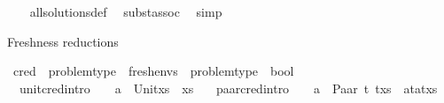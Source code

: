 \begin{isabellebody}
%
\isadelimproof
\ \ %
\endisadelimproof
%
\isatagproof
{}\isamarkupfalse%
\ all{\isacharunderscore}{\kern0pt}solutions{\isacharunderscore}{\kern0pt}def\ \isamarkupfalse%
\ subst{\isacharunderscore}{\kern0pt}assoc\ \isamarkupfalse%
\ simp%
\endisatagproof
{\isafoldproof}%
%
\isadelimproof
%
\endisadelimproof
%
\begin{isamarkuptext}%
Freshness reductions%
\end{isamarkuptext}\isamarkuptrue%
\isamarkupfalse%
\ c{\isacharunderscore}{\kern0pt}red\ {\isacharcolon}{\kern0pt}{\isacharcolon}{\kern0pt}\ {\isachardoublequoteopen}problem{\isacharunderscore}{\kern0pt}type\ {\isasymRightarrow}\ fresh{\isacharunderscore}{\kern0pt}envs\ {\isasymRightarrow}\ problem{\isacharunderscore}{\kern0pt}type\ {\isasymRightarrow}\ bool{\isachardoublequoteclose}\ {\isacharparenleft}{\kern0pt}{\isachardoublequoteopen}{\isacharunderscore}{\kern0pt}\ {\isasymturnstile}\ {\isacharunderscore}{\kern0pt}\ {\isasymrightarrow}\ {\isacharunderscore}{\kern0pt}\ {\isachardoublequoteclose}\ {\isacharbrackleft}{\kern0pt}{}{}{\isacharcomma}{\kern0pt}{}{}{\isacharcomma}{\kern0pt}{}{}{\isacharbrackright}{\kern0pt}\ {}{}{\isacharparenright}{\kern0pt}\isanewline
\ \ \isanewline
\ \ unit{\isacharunderscore}{\kern0pt}cred{\isacharbrackleft}{\kern0pt}intro{\isacharbang}{\kern0pt}{\isacharbrackright}{\kern0pt}{\isacharcolon}{\kern0pt}\ \ \ \ {\isachardoublequoteopen}{\isacharparenleft}{\kern0pt}{\isacharbrackleft}{\kern0pt}{\isacharbrackright}{\kern0pt}{\isacharcomma}{\kern0pt}{\isacharparenleft}{\kern0pt}a\ {\isasymsharp}{\isacharquery}{\kern0pt}\ Unit{\isacharparenright}{\kern0pt}{\isacharhash}{\kern0pt}xs{\isacharparenright}{\kern0pt}\ {\isasymturnstile}{\isacharbraceleft}{\kern0pt}{\isacharbraceright}{\kern0pt}{\isasymrightarrow}\ {\isacharparenleft}{\kern0pt}{\isacharbrackleft}{\kern0pt}{\isacharbrackright}{\kern0pt}{\isacharcomma}{\kern0pt}xs{\isacharparenright}{\kern0pt}{\isachardoublequoteclose}\ {\isacharbar}{\kern0pt}\isanewline
\ \ paar{\isacharunderscore}{\kern0pt}cred{\isacharbrackleft}{\kern0pt}intro{\isacharbang}{\kern0pt}{\isacharbrackright}{\kern0pt}{\isacharcolon}{\kern0pt}\ \ \ \ {\isachardoublequoteopen}{\isacharparenleft}{\kern0pt}{\isacharbrackleft}{\kern0pt}{\isacharbrackright}{\kern0pt}{\isacharcomma}{\kern0pt}{\isacharparenleft}{\kern0pt}a\ {\isasymsharp}{\isacharquery}{\kern0pt}\ Paar\ t{}\ t{}{\isacharparenright}{\kern0pt}{\isacharhash}{\kern0pt}xs{\isacharparenright}{\kern0pt}\ {\isasymturnstile}{\isacharbraceleft}{\kern0pt}{\isacharbraceright}{\kern0pt}{\isasymrightarrow}\ {\isacharparenleft}{\kern0pt}{\isacharbrackleft}{\kern0pt}{\isacharbrackright}{\kern0pt}{\isacharcomma}{\kern0pt}{\isacharparenleft}{\kern0pt}a{\isasymsharp}{\isacharquery}{\kern0pt}t{}{\isacharparenright}{\kern0pt}{\isacharhash}{\kern0pt}{\isacharparenleft}{\kern0pt}a{\isasymsharp}{\isacharquery}{\kern0pt}t{}{\isacharparenright}{\kern0pt}{\isacharhash}{\kern0pt}xs{\isacharparenright}{\kern0pt}{\isachardoublequoteclose}\ {\isacharbar}{\kern0pt}\isanewline

\end{isabellebody}
